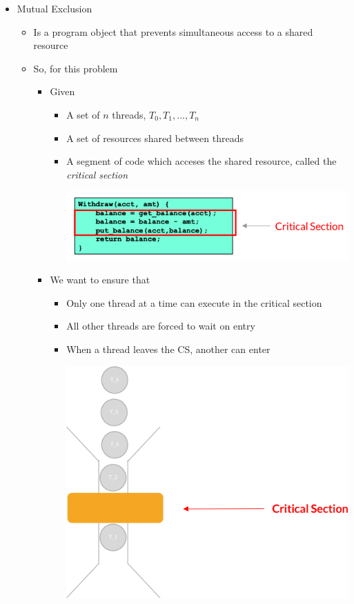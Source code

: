 \documentclass[12pt]{article}
\begin{document}
\begin{itemize}
    \item Mutual Exclusion
    \begin{itemize}
        \item Is a program object that prevents simultaneous access to a shared
        resource
        \item So, for this problem
        \begin{itemize}
            \item Given

            \begin{itemize}
                \item A set of $n$ threads, $T_0, T_1, ... , T_n$
                \item A set of resources shared between threads
                \item A segment of code which acceses the shared resource, called
                the \textit{critical section}

                \begin{center}
                \includegraphics[width=0.7\linewidth]{images/week_2_notes_2_5.png}
                \end{center}
            \end{itemize}

            \item We want to ensure that

            \begin{itemize}
                \item Only one thread at a time can execute in the critical section
                \item All other threads are forced to wait on entry
                \item When a thread leaves the CS, another can enter


                \begin{center}
                \includegraphics[width=0.5\linewidth]{images/week_2_notes_2_6.png}
                \end{center}
            \end{itemize}
        \end{itemize}
    \end{itemize}


\end{itemize}
\end{document}
